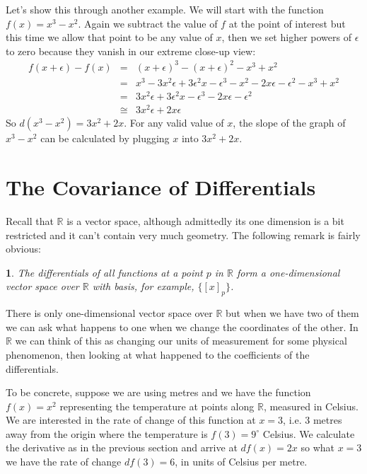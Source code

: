 \documentclass[oneside,english]{amsbook}
\numberwithin{section}{chapter}
\theoremstyle{plain}
\newtheorem{thm}{\protect\theoremname}
\theoremstyle{definition}
\providecommand{\theoremname}{Theorem}
\begin{document}
			Let's show this through another example. We will start with the function $f(x) = x^3 - x^2$. Again we subtract the value of $f$ at the point of interest but this time we allow that point to be any value of $x$, then we set higher powers of $\epsilon$ to zero because they vanish in our extreme close-up view:
			\begin{align}
				f(x + \epsilon) - f(x) &=& (x + \epsilon)^3 - (x + \epsilon)^2 - x^3 + x^2 \\
	                                                  &=& x^3 - 3 x^2 \epsilon + 3 \epsilon^2 x  - \epsilon^3 - x^2 - 2x\epsilon -\epsilon^2 - x^3 + x^2 \\
	                                                   &=& 3 x^2 \epsilon + 3 \epsilon^2 x  - \epsilon^3 - 2x\epsilon -\epsilon^2 \\
	                                                   &\cong& 3 x^2 \epsilon + 2x\epsilon 
			\end{align}
			So $d(x^3-x^2) = 3x^2 + 2x$. For any valid value of $x$, the slope of the graph of $x^3-x^2$ can be calculated by plugging $x$ into $3x^2 + 2x$. 
						
		\section{The Covariance of Differentials}
			
			Recall that $\mathbb{R}$ is a vector space, although admittedly its one dimension is a bit restricted and it can't contain very much geometry. The following remark is fairly obvious:
			\begin{thm}
				The differentials of all functions at a point $p$ in $\mathbb{R}$ form a one-dimensional vector space over $\mathbb{R}$ with basis, for example, $\{[x]_p\}$.
			\end{thm}
			There is only one-dimensional vector space over $\mathbb{R}$ but when we have two of them we can ask what happens to one when we change the coordinates of the other. In $\mathbb{R}$ we can think of this as changing our units of measurement for some physical phenomenon, then looking at what happened to the coefficients of the differentials.
			
			To be concrete, suppose we are using metres and we have the function $f(x) = x^2$ representing the temperature at points along $\mathbb{R}$, measured in Celsius. We are interested in the rate of change of this function at $x = 3$, i.e. 3 metres away from the origin where the temperature is $f(3) = 9^\circ$ Celsius. We calculate the derivative as in the previous section and arrive at $df(x) = 2x$ so what $x = 3$ we have the rate of change $df(3) = 6$, in units of Celsius per metre.
			
\end{document}
